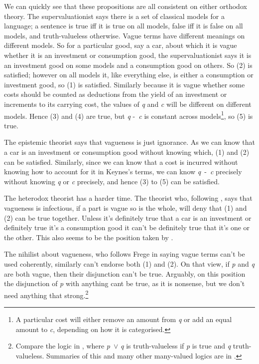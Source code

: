 We can quickly see that these propositions are all consistent on either orthodox theory. The supervaluationist says there is a set of classical models for a language; a sentence is true iff it is true on all models, false iff it is false on all models, and truth-valueless otherwise. Vague terms have different meanings on different models. So for a particular good, say a car, about which it is vague whether it is an investment or consumption good, the supervaluationist says it is an investment good on some models and a consumption good on others. So (2) is satisfied; however on all models it, like everything else, is either a consumption or investment good, so (1) is satisfied. Similarly because it is vague whether some costs should be counted as deductions from the yield of an investment or increments to its carrying cost, the values of \textit{q} and \textit{c} will be different on different models. Hence (3) and (4) are true, but \textit{q} \nobreakdash-~\textit{c} is constant across models\footnote{A particular cost will either remove an amount from \textit{q} or add an equal amount to \textit{c}, depending on how it is categorised.}, so (5) is true.

The epistemic theorist says that vagueness is just ignorance. As we can know that a car is an investment or consumption good without knowing which, (1) and (2) can be satisfied. Similarly, since we can know that a cost is incurred without knowing how to account for it in Keynes's terms, we can know \textit{q}~\nobreakdash-~\textit{c} precisely without knowing \textit{q} or \textit{c} precisely, and hence (3) to (5) can be satisfied.

The heterodox theorist has a harder time. The theorist who, following \citet{Russell1923}, says that vagueness is infectious, if a part is vague so is the whole, will deny that (1) and (2) can be true together. Unless it's definitely true that a car is an investment or definitely true it's a consumption good it can't be definitely true that it's one or the other. This also seems to be the position taken by \citet{Wittgenstein1953}.

The nihilist about vagueness, who follows Frege in saying vague terms can't be used coherently, similarly can't endorse both (1) and (2). On that view, if \textit{p} and \textit{q} are both vague, then their disjunction can't be true. Arguably, on this position the disjunction of \textit{p} with anything can{\textquotesingle}t be true, as it is nonsense, but we don't need anything that strong.\footnote{Compare the logic in \citet{Bochvar1939}, where \textit{p}~${\vee}$ \textit{q} is truth-valueless if \textit{p} is true and \textit{q} truth\nobreakdash-valueless. Summaries of this and many other many-valued logics are in \citet{Haack1974}.}

